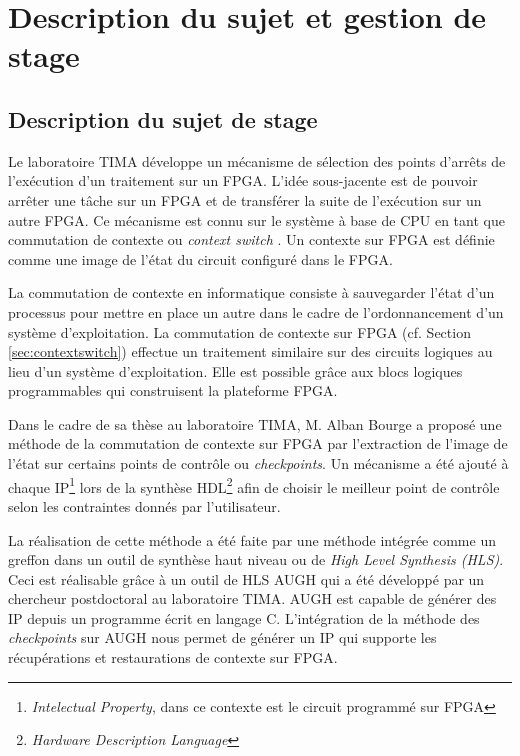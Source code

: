 \chapter{Description du sujet et gestion de stage}
\label{chap:sujet}
\OnehalfSpacing

\section{Description du sujet de stage}
\label{sec:sujet}

Le laboratoire TIMA développe un mécanisme de sélection des points
d'arrêts de l'exécution d'un traitement sur un FPGA. L'idée sous-jacente
est de pouvoir arrêter une tâche sur un FPGA et de transférer la suite de
l'exécution sur un autre FPGA. Ce mécanisme est connu sur le système à base de CPU 
en tant que \og commutation de contexte ou \emph{context switch} \fg.
Un contexte sur FPGA est définie comme une image de l'état du circuit configuré dans le FPGA.

La commutation de contexte en informatique consiste à sauvegarder
l'état d'un processus pour mettre en place un autre dans le cadre de l'ordonnancement 
d'un système d'exploitation. La commutation de contexte sur FPGA (cf. Section \ref{sec:contextswitch}) 
effectue un traitement similaire sur des circuits logiques au lieu d'un système d'exploitation. 
Elle est possible grâce aux blocs logiques programmables
qui construisent la plateforme FPGA.

Dans le cadre de sa thèse au laboratoire TIMA, M. Alban Bourge a proposé une méthode de la commutation 
de contexte sur FPGA par l'extraction de l'image de l'état sur certains points de contrôle\cite{Bourge2015} ou \emph{checkpoints}. 
Un mécanisme a été ajouté à chaque IP\footnote{\emph{Intelectual Property}, dans ce contexte est le circuit programmé sur FPGA} lors de la synthèse
HDL\footnote{\emph{Hardware Description Language}} afin de choisir le meilleur point de contrôle selon les contraintes donnés par l'utilisateur.

La réalisation de cette méthode a été faite par une méthode intégrée comme un greffon
dans un outil de synthèse haut niveau ou de \emph{High Level Synthesis (HLS)}.
Ceci est réalisable grâce à un outil de HLS AUGH\cite{Prost2014}
qui a été développé par un chercheur postdoctoral au laboratoire TIMA.
AUGH est capable de générer des IP 
depuis un programme écrit en langage C. L'intégration de la méthode des \emph{checkpoints} sur AUGH 
nous permet de générer un IP qui supporte les récupérations et restaurations de contexte sur FPGA.

